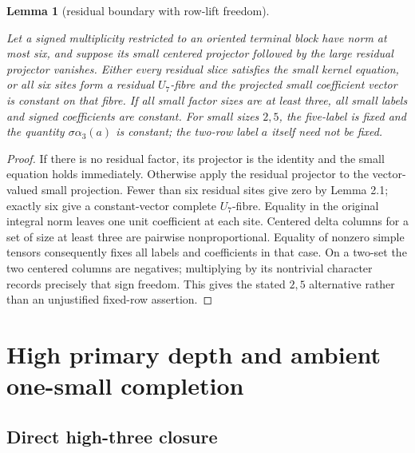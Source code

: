 \documentclass[11pt]{amsart}
\numberwithin{theorem}{section}
\newtheorem{lemma}[theorem]{Lemma}
\theoremstyle{remark}
\numberwithin{equation}{section}
\begin{document}
\begin{lemma}[residual boundary with row-lift freedom]\label{lemma:6.2}

Let a signed multiplicity restricted to an oriented terminal block have
norm at most six, and suppose its small centered projector followed by the
large residual projector vanishes. Either every residual slice satisfies
the small kernel equation, or all six sites form a residual \(U_7\)-fibre
and the projected small coefficient vector is constant on that fibre.
If all small factor sizes are at least three, all small labels and signed
coefficients are constant. For small sizes \(2,5\), the five-label is
fixed and the quantity \(\sigma\alpha_3(a)\) is constant; the two-row
label \(a\) itself need not be fixed.

\end{lemma}
\begin{proof}

If there is no residual factor, its projector is the identity and the
small equation holds immediately. Otherwise apply the residual projector
to the vector-valued small projection. Fewer than six residual sites give
zero by Lemma 2.1; exactly six give a constant-vector complete
\(U_7\)-fibre. Equality in the original integral norm leaves one unit
coefficient at each site. Centered delta columns for a set of size at
least three are pairwise nonproportional. Equality of nonzero simple
tensors consequently fixes all labels and coefficients in that case.
On a two-set the two centered columns are negatives; multiplying by its
nontrivial character records precisely that sign freedom. This gives the
stated \(2,5\) alternative rather than an unjustified fixed-row assertion.
\end{proof}

\section{High primary depth and ambient one-small completion}\label{sec:7}

\subsection{Direct high-three closure}\label{sec:7.1}
\end{document}
